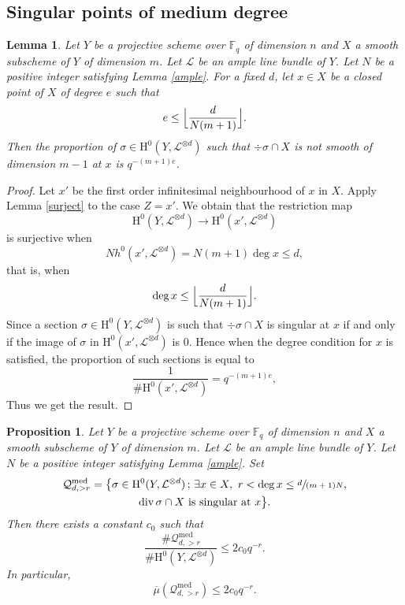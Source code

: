 \documentclass[11pt]{article}
\newcommand{\Subsection}{\subsection}
\numberwithin{equation}{section}
\newcommand{\sep}{\,;\,}
\theoremstyle{plain}
\newtheorem{lem}[thm]{Lemma}
\newtheorem{prop}[thm]{Proposition}
\theoremstyle{definition}
\newcommand{\ho}{\mathrm{H}}
\newcommand{\li}{\mathcal{L}}
\newcommand{\F}{\mathbb{F}}
\begin{document}
\Subsection{Singular points of medium degree}

\begin{lem}\label{singpt}
Let $Y$ be a projective scheme over $\F_q$ of dimension $n$ and $X$ a smooth subscheme of $Y$ of dimension $m$. Let $\li$ be an ample line bundle of $Y$. Let $N$ be a positive integer satisfying Lemma \ref{ample}. For a fixed $d$, let $x\in X$ be a closed point of $X$ of degree $e$ such that
\[
e\leq \Bigl\lfloor \frac{d}{N(m+1)} \Bigr\rfloor.
\]
Then the proportion of $\sigma\in \ho^0(Y, \li^{\otimes d})$ such that $\div \sigma\cap X$ is not smooth of dimension $m-1$ at $x$ is $q^{-(m+1)e}$.
\end{lem}
\begin{proof}
Let $x'$ be the first order infinitesimal neighbourhood of $x$ in $X$. Apply Lemma \ref{surject} to the case $Z=x'$. We obtain that the restriction map
\[
\ho^0(Y, \li^{\otimes d})\to \ho^0(x', \li^{\otimes d})
\]
is surjective when
\[
Nh^0(x', \li^{\otimes d})=N(m+1)\deg x\leq d,
\]
that is, when
\[
\deg x\leq \Bigl\lfloor \frac{d}{N(m+1)} \Bigr\rfloor.
\]
Since a section $\sigma\in \ho^0(Y, \li^{\otimes d})$ is such that $\div \sigma\cap X$ is singular at $x$ if and only if the image of $\sigma$ in $\ho^0(x', \li^{\otimes d})$ is $0$. Hence when the degree condition for $x$ is satisfied, the proportion of such sections is equal to
\[
\frac{1}{\#\ho^0(x', \li^{\otimes d})}=q^{-(m+1)e},
\]
Thus we get the result.
\end{proof}
\begin{prop} \label{mediumf}
Let $Y$ be a projective scheme over $\F_q$ of dimension $n$ and $X$ a smooth subscheme of $Y$ of dimension $m$. Let $\li$ be an ample line bundle of $Y$. Let $N$ be a positive integer satisfying Lemma \ref{ample}. Set\vspace*{-3pt}
\begin{multline*}
\mathcal{Q}_{d, >r}^{\mathrm{med}} = \bigl\{ \sigma\in \ho^0(Y,\li^{\otimes d})\sep \exists x\in X,\ r<\deg x\leq \sfrac{d}{(m+1)N},\\ \div \sigma\cap X \text{ is singular at }x \bigl\}.
\end{multline*}
Then there exists a constant $c_0$ such that
\[
\frac{\#\mathcal{Q}_{d, >r}^{\mathrm{med}}}{\# \ho^0(Y, \mathcal{L}^{\otimes d})} \leq 2c_0q^{-r}.
\]
In particular,\vspace*{-3pt}
\[
\overline{\mu}(\mathcal{Q}_{d, >r}^{\mathrm{med}})\leq 2c_0q^{-r}.
\]
\end{prop}
\end{document}
